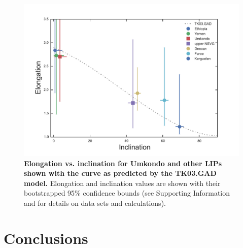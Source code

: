 \documentclass[11pt,letterpaper]{article}
\begin{document}
\begin{figure}[h!]
\includegraphics[width=5 in]{figures/EI.pdf}
\caption{\textbf{ Elongation vs. inclination for Umkondo and other LIPs shown with the curve as predicted by the TK03.GAD model.} Elongation and inclination values are shown with their bootstrapped 95$\%$ confidence bounds (see Supporting Information and \cite{Tauxe2008a} for details on data sets and calculations).}
\label{fig:EI}
\end{figure}

\section*{Conclusions}
\end{document}
